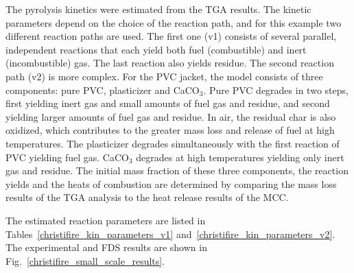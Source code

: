 The pyrolysis kinetics were estimated from the TGA results. The kinetic parameters depend on the choice of the reaction path, and for this example two different reaction paths are used. The first one (v1) consists of several parallel, independent reactions that each yield both fuel (combustible) and inert (incombustible) gas. The last reaction also yields residue. The second reaction path (v2) is more complex. For the PVC jacket, the model consists of three components: pure PVC, plasticizer and CaCO$_3$. Pure PVC degrades in two steps, first yielding inert gas and small amounts of fuel gas and residue, and second yielding larger amounts of fuel gas and residue. In air, the residual char is also oxidized, which contributes to the greater mass loss and release of fuel at high temperatures. The plasticizer degrades simultaneously with the first reaction of PVC yielding fuel gas. CaCO$_3$ degrades at high temperatures yielding only inert gas and residue. The initial mass fraction of these three components, the reaction yields and the heats of combustion are determined by comparing the mass loss results of the TGA analysis to the heat release results of the MCC.

The estimated reaction parameters are listed in Tables~\ref{christifire_kin_parameters_v1} and~\ref{christifire_kin_parameters_v2}.
The experimental and FDS results are shown in Fig.~\ref{christifire_small_scale_results}.

